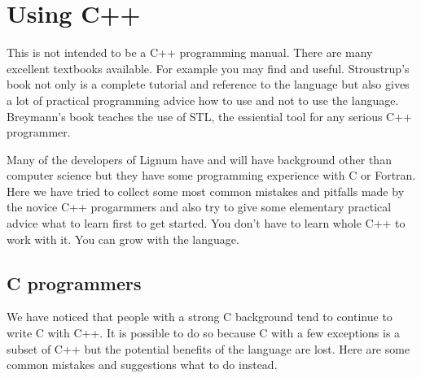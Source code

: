 \section{Using C++}

This is not  intended to be a C++ programming  manual.  There are many
excellent textbooks available.  For  example you may find \cite{Str97}
and  \cite{Brey98} useful. Stroustrup's  book not  only is  a complete
tutorial  and  reference to  the  language but  also  gives  a lot  of
practical  programming  advice   how  to  use  and  not   to  use  the
language. Breymann's book teaches the  use of STL, the essiential tool
for any serious C++ programmer.

Many of the  developers of Lignum have and  will have background other
than computer science but they have some programming experience with C
or Fortran.  Here  we have tried to collect  some most common mistakes
and pitfalls made  by the novice C++ progarmmers and  also try to give
some elementary practical  advice what to learn first  to get started.
You don't have to  learn whole C++ to work with it.  You can grow with
the language.

\subsection{C programmers}

We  have  noticed that  people  with a  strong  C  background tend  to
continue to write C with C++. It is possible to do so because C with a
few exceptions  is a subset of  C++ but the potential  benefits of the
language are lost.  Here are some common mistakes and suggestions what
to do instead.

